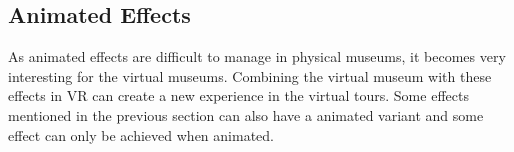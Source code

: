 \documentclass[a4paper]{article}
\begin{document}
\begin{itemize}

\end{itemize}

\subsection{Animated Effects}\label{sec:animeffects}


As animated effects are difficult to manage in physical museums, it becomes very interesting for the virtual museums. Combining the virtual museum with these effects in VR can create a new experience in the virtual tours. Some effects mentioned in the previous section can also have a animated variant and some effect can only be achieved when animated.
\end{document}
